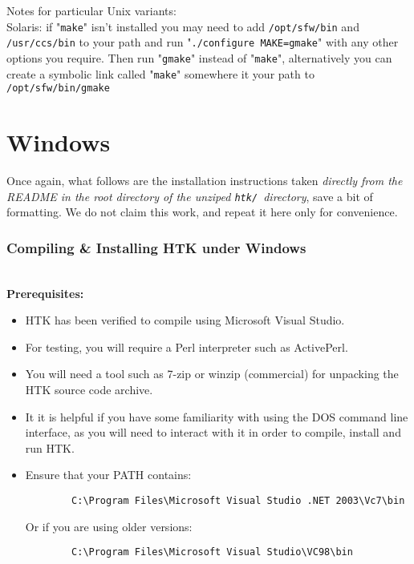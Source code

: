 \documentclass{wileySev}
\begin{document}
Notes for particular Unix variants:\\
Solaris: if "\texttt{make}" isn't installed you may need to add \texttt{/opt/sfw/bin}
and \texttt{/usr/ccs/bin} to your path and run "\texttt{./configure MAKE=gmake}" with
any other options you require.  Then run "\texttt{gmake}" instead of "\texttt{make}",
alternatively you can create a symbolic link called "\texttt{make}" somewhere
it your path to \texttt{/opt/sfw/bin/gmake}

\section{Windows}
Once again, what follows are the installation instructions taken \textit{directly from the README in the root directory of the unziped \texttt{htk/ }directory}, save a bit of formatting. We do not claim this work, and repeat it here only for convenience.\\
\subsubsection{Compiling \& Installing HTK under Windows}~\\

\textbf{Prerequisites:}
\begin{itemize}
	\item HTK has been verified to compile using Microsoft Visual Studio.
	\item For testing, you will require a Perl interpreter such as ActivePerl. 
	\item You will need a tool such as 7-zip or winzip (commercial) for unpacking the HTK source code archive.
	\item It it is helpful if you have some familiarity with using the DOS command line interface, as you will need to interact with it in order to compile, install and run HTK.
	\item Ensure that your PATH contains:
		\begin{verbatim}
		C:\Program Files\Microsoft Visual Studio .NET 2003\Vc7\bin
		\end{verbatim}
		Or if you are using older versions:
		\begin{verbatim}
		C:\Program Files\Microsoft Visual Studio\VC98\bin
		\end{verbatim}
\end{itemize}
\end{document}
